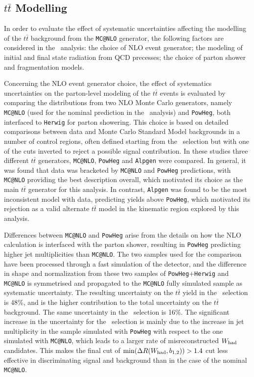\subsection{$t\bar{t}$ Modelling}
\label{sec:systematic_ttbarmodel}

In order to evaluate the effect of systematic uncertainties 
affecting the modelling of the $t\bar{t}$ background from the
\texttt{MC@NLO} generator, the following factors are considered
in the \wbx\ analysis: the choice of NLO event generator;
the modeling of initial and final state radiation from QCD
precesses; the choice of parton shower and fragmentation models.

Concerning the NLO event generator choice, the effect of 
systematics uncertainties on the parton-level modeling of the
$t\bar{t}$ events is evaluated by comparing the distributions from two 
NLO Monte Carlo generators, namely \texttt{MC@NLO} (used for the nominal 
prediction in the \wbx\ 
analysis) and \texttt{PowHeg}, both interfaced to \texttt{Herwig} for
parton showering.  This choice is based on detailed comparisons
between data and Monte Carlo Standard Model backgrounds in a number 
of control regions, often defined starting from the \loose\ selection 
but with one of the cuts inverted to reject a possible signal contribution. 
In these studies three different $t\bar{t}$ generators, \texttt{MC@NLO}, \texttt{PowHeg} and
\texttt{Alpgen} were compared. In general, it was found that 
data was bracketed by \texttt{MC@NLO} and \texttt{PowHeg} predictions,
with \texttt{MC@NLO} providing the best description overall, which 
motivated its choice as the main $t\bar{t}$ generator for this analysis. 
In contrast, \texttt{Alpgen} was found to be the most inconsistent 
model with data, predicting yields above \texttt{PowHeg}, which 
motivated its rejection
as a valid alternate $t\bar{t}$  model in the kinematic region 
explored by this analysis.

Differences between \texttt{MC@NLO} and \texttt{PowHeg} arise from 
the details on how the NLO calculation is interfaced with the parton 
shower, resulting in \texttt{PowHeg} predicting higher
jet multiplicities than \texttt{MC@NLO}. The two samples used for the
comparison have been processed through a fast simulation of the detector,
and the difference in shape and normalization from these two samples of
\texttt{PowHeg}+\texttt{Herwig} 
and \texttt{MC@NLO} is symmetrised and propagated to the 
\texttt{MC@NLO} fully simulated sample as systematic uncertainty. 
The resulting uncertainty on the $t\bar{t}$ yield in the \tight\ selection 
is 48\%, and is the higher contribution to the total uncertainty
on the $t\bar{t}$ background. The same uncertainty in the \loose\ selection 
is 16\%. The significant
increase in the uncertainty for the \tight\ selection 
is mainly due to the increase in jet multiplicity in the
sample simulated with \texttt{PowHeg} with respect to the
one simulated with \texttt{MC@NLO}, 
which leads to a larger rate of misreconstructed $W_{\rm had}$ 
candidates. This makes the final cut of 
$\min(\Delta R(W_{\rm had}, b_{1,2}))>1.4$ cut less 
effective in discriminating signal and background than in the 
case of the nominal \texttt{MC@NLO}.

